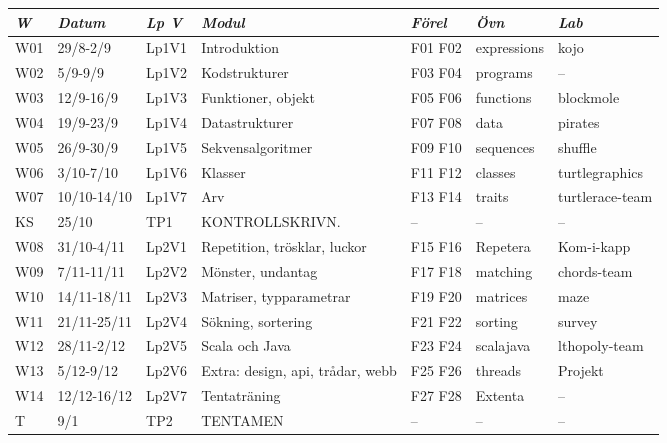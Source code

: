 \begin{tabular}{l|l|l|l|l|l|l}
\textit{W} & \textit{Datum} & \textit{Lp V} & \textit{Modul} & \textit{Förel} & \textit{Övn} & \textit{Lab} \\ \hline \hline
W01 & 29/8-2/9 & Lp1V1 & Introduktion & F01 F02 & expressions & kojo \\
W02 & 5/9-9/9 & Lp1V2 & Kodstrukturer & F03 F04 & programs & -- \\
W03 & 12/9-16/9 & Lp1V3 & Funktioner, objekt & F05 F06 & functions & blockmole \\
W04 & 19/9-23/9 & Lp1V4 & Datastrukturer & F07 F08 & data & pirates \\
W05 & 26/9-30/9 & Lp1V5 & Sekvensalgoritmer & F09 F10 & sequences & shuffle \\
W06 & 3/10-7/10 & Lp1V6 & Klasser & F11 F12 & classes & turtlegraphics \\
W07 & 10/10-14/10 & Lp1V7 & Arv & F13 F14 & traits & turtlerace-team \\
KS & 25/10 & TP1 & KONTROLLSKRIVN. & -- & -- & -- \\
W08 & 31/10-4/11 & Lp2V1 & Repetition, trösklar, luckor & F15 F16 & Repetera & Kom-i-kapp \\
W09 & 7/11-11/11 & Lp2V2 & Mönster, undantag & F17 F18 & matching & chords-team \\
W10 & 14/11-18/11 & Lp2V3 & Matriser, typparametrar & F19 F20 & matrices & maze \\
W11 & 21/11-25/11 & Lp2V4 & Sökning, sortering & F21 F22 & sorting & survey \\
W12 & 28/11-2/12 & Lp2V5 & Scala och Java & F23 F24 & scalajava & lthopoly-team \\
W13 & 5/12-9/12 & Lp2V6 & Extra: design, api, trådar, webb & F25 F26 & threads & Projekt \\
W14 & 12/12-16/12 & Lp2V7 & Tentaträning & F27 F28 & Extenta & -- \\
T & 9/1 & TP2 & TENTAMEN & -- & -- & -- \\
\end{tabular}
